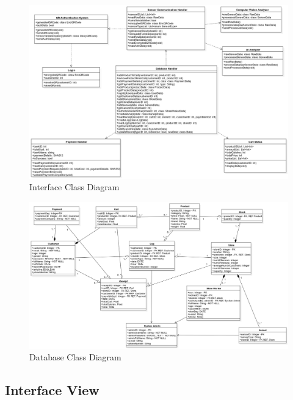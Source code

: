 \documentclass[11pt]{article}
\begin{document}
    \begin{center}
        \begin{figure}[H]
            \includegraphics[width=\linewidth]{Images/InterfaceClassDiagram.png}
            \caption{Interface Class Diagram}
            \label{icd}
        \end{figure}
    \end{center}

    \begin{center}
        \begin{figure}[H]
            \includegraphics[width=\linewidth]{Images/DatabaseClassDiagram.png}
            \caption{Database Class Diagram}
            \label{dcd}
        \end{figure}
    \end{center}

    \subsection{Interface View}
\end{document}
